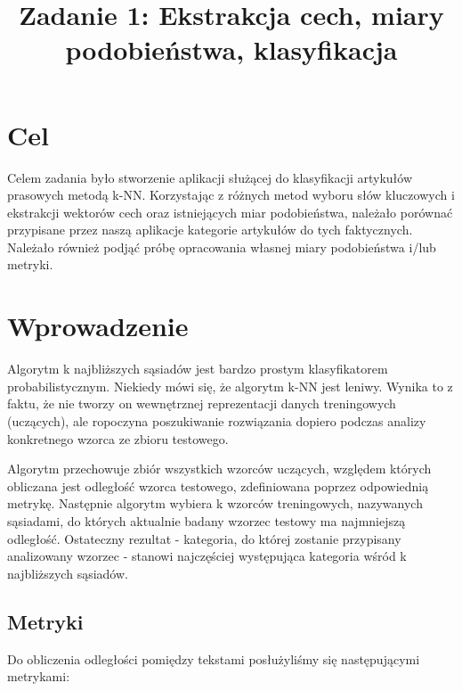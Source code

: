 \documentclass{classrep}
\author{
\studentinfo{Mateusz Walczak}{216911} \and
\studentinfo{Konrad Kajszczak}{216790}
}
\title{Zadanie 1: Ekstrakcja cech, miary podobieństwa, klasyfikacja}
\begin{document}
\maketitle

\section{Cel}
{Celem zadania było stworzenie aplikacji służącej do klasyfikacji artykułów prasowych metodą k-NN. Korzystając z różnych metod
wyboru słów kluczowych i ekstrakcji wektorów cech oraz istniejących miar podobieństwa, należało porównać przypisane przez naszą aplikacje kategorie artykułów do tych faktycznych. Należało również podjąć próbę opracowania własnej miary podobieństwa i/lub metryki.}

\section{Wprowadzenie}
Algorytm k najbliższych sąsiadów jest bardzo prostym klasyfikatorem probabilistycznym. Niekiedy mówi się, że algorytm k-NN jest leniwy. Wynika to z faktu, że nie tworzy on wewnętrznej reprezentacji danych treningowych (uczących), ale ropoczyna poszukiwanie rozwiązania dopiero podczas analizy konkretnego wzorca ze zbioru testowego. \newline

Algorytm przechowuje zbiór wszystkich wzorców uczących, względem których obliczana jest odległość wzorca testowego, zdefiniowana poprzez odpowiednią metrykę. Następnie algorytm wybiera k wzorców treningowych, nazywanych sąsiadami, do których aktualnie badany wzorzec testowy ma najmniejszą odległość. Ostateczny rezultat - kategoria, do której zostanie przypisany analizowany wzorzec - stanowi najczęściej występująca kategoria wśród k najbliższych sąsiadów.

\subsection{Metryki}

Do obliczenia odległości pomiędzy tekstami posłużyliśmy się następującymi metrykami:
\end{document}
